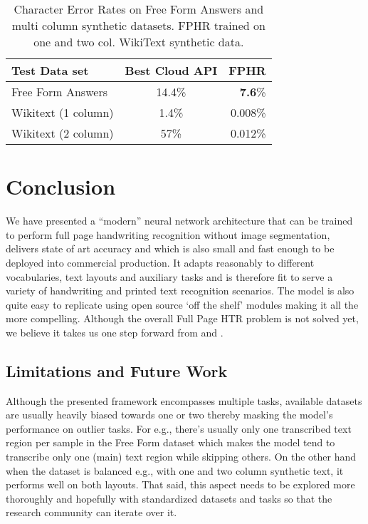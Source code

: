 \documentclass[runningheads]{llncs}
\begin{document}
\begin{table}
\caption{Character Error Rates on Free Form Answers and multi column synthetic datasets. FPHR trained on one and two col. WikiText synthetic data.}
\label{tab-free-response}
\vskip 0.15in
\begin{center}
\begin{small}
\begin{tabular}{|l|c|r|}
\toprule
Test Data set & Best Cloud API & FPHR \\
\midrule
Free Form Answers    & 14.4\% & \textbf{7.6}\% \\
Wikitext (1 column)   & 1.4\% & 0.008\% \\
Wikitext (2 column)   & 57\% & 0.012\% \\
\bottomrule
\end{tabular}
\end{small}
\end{center}
\vskip -0.1in
\end{table}

\section{Conclusion}
We have presented a ``modern'' neural network architecture that can be trained to perform full page handwriting recognition without image segmentation, delivers state of art accuracy and which is also small and fast enough to be deployed into commercial production. It adapts reasonably to different vocabularies, text layouts and auxiliary tasks and is therefore fit to serve a variety of handwriting and printed text recognition scenarios. The model is also quite easy to replicate using open source `off the shelf' modules making it all the more compelling. Although the overall Full Page HTR problem is not solved yet, we believe it takes us one step forward from \citep{DBLP:journals/corr/BlucheLM16} and \citep{Bluche2016JointLS}.

\subsection{Limitations and Future Work}
Although the presented framework encompasses multiple tasks, available datasets are usually heavily biased towards one or two thereby masking the model's performance on outlier tasks. For e.g., there's usually only one transcribed text region per sample in the Free Form dataset which makes the model tend to transcribe only one (main) text region while skipping others. On the other hand when the dataset is balanced e.g., with one and two column synthetic text, it performs well on both layouts. That said, this aspect needs to be explored more thoroughly and hopefully with standardized datasets and tasks so that the research community can iterate over it.
\end{document}
